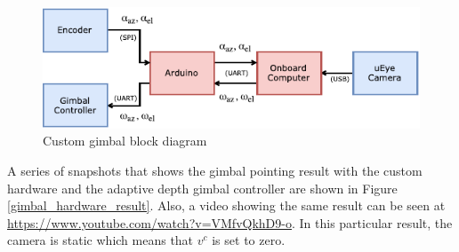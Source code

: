 \begin{figure}[htbp]
	\centering
	\includegraphics[width=0.8\linewidth]{images/chapter2/gimbal_system_blockdiagram}
	\caption{Custom gimbal block diagram}
	\label{gimbal_blockdiagram}
\end{figure}
A series of snapshots that shows the gimbal pointing result with the custom hardware and the adaptive depth gimbal controller are shown in Figure \ref{gimbal_hardware_result}. Also, a video showing the same result can be seen at \href{https://www.youtube.com/watch?v=VMfvQkhD9-o}{https://www.youtube.com/watch?v=VMfvQkhD9-o}. In this particular result, the camera is static which means that $v^c$ is set to zero.

